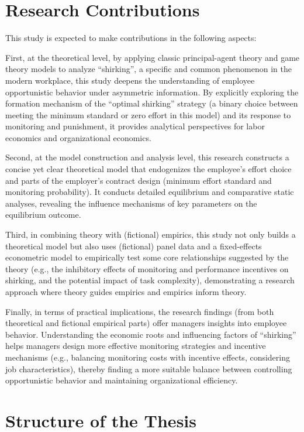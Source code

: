 \section{Research Contributions}

This study is expected to make contributions in the following aspects:

First, at the {theoretical level}, by applying classic {principal-agent theory} and {game theory} models to analyze \enquote{shirking}, a specific and common phenomenon in the modern workplace, this study deepens the understanding of employee opportunistic behavior under asymmetric information. By explicitly exploring the formation mechanism of the \enquote{optimal shirking} strategy (a binary choice between meeting the minimum standard or zero effort in this model) and its response to monitoring and punishment, it provides analytical perspectives for labor economics and organizational economics.

Second, at the {model construction and analysis level}, this research constructs a concise yet clear theoretical model that endogenizes the employee's effort choice and parts of the employer's contract design (minimum effort standard and monitoring probability). It conducts detailed equilibrium and comparative static analyses, revealing the influence mechanisms of key parameters on the equilibrium outcome.

Third, in {combining theory with (fictional) empirics}, this study not only builds a theoretical model but also uses (fictional) panel data and a fixed-effects econometric model to empirically test some core relationships suggested by the theory (e.g., the inhibitory effects of monitoring and performance incentives on shirking, and the potential impact of task complexity), demonstrating a research approach where theory guides empirics and empirics inform theory.

Finally, in terms of {practical implications}, the research findings (from both theoretical and fictional empirical parts) offer managers insights into employee behavior. Understanding the economic roots and influencing factors of \enquote{shirking} helps managers design more effective monitoring strategies and incentive mechanisms (e.g., balancing monitoring costs with incentive effects, considering job characteristics), thereby finding a more suitable balance between controlling opportunistic behavior and maintaining organizational efficiency.

\section{Structure of the Thesis}

